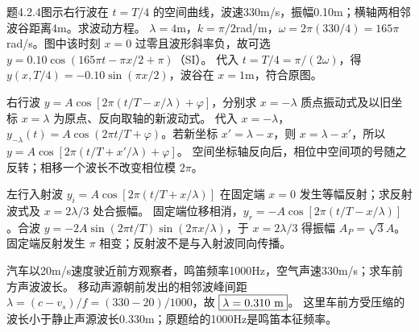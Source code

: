 \problemtext 题4.2.4图示右行波在 $t=T/4$ 的空间曲线，波速330m/s，振幅0.10m；横轴两相邻波谷距离4m。求波动方程。
\workings $\lambda=4$m，$k=\pi/2$rad/m，$\omega=2\pi(330/4)=165\pi$rad/s。图中该时刻 $x=0$ 过零且波形斜率负，故可选 $\boxed{y=0.10\cos(165\pi t-\pi x/2+\pi)}$（SI）。
\crosscheck 代入 $t=T/4=\pi/(2\omega)$，得 $y(x,T/4)=-0.10\sin(\pi x/2)$，波谷在 $x=1$m，符合原图。

\problemtext 右行波 $y=A\cos[2\pi(t/T-x/\lambda)+\varphi]$，分别求 $x=-\lambda$ 质点振动式及以旧坐标 $x=\lambda$ 为原点、反向取轴的新波动式。
\workings 代入 $x=-\lambda$，$\boxed{y_{-\lambda}(t)=A\cos(2\pi t/T+\varphi)}$。若新坐标 $x'=\lambda-x$，则 $x=\lambda-x'$，所以 $\boxed{y=A\cos[2\pi(t/T+x'/\lambda)+\varphi]}$。
\crosscheck 空间坐标轴反向后，相位中空间项的号随之反转；相移一个波长不改变相位模 $2\pi$。

\problemtext 左行入射波 $y_i=A\cos[2\pi(t/T+x/\lambda)]$ 在固定端 $x=0$ 发生等幅反射；求反射波式及 $x=2\lambda/3$ 处合振幅。
\workings 固定端位移相消，$\boxed{y_r=-A\cos[2\pi(t/T-x/\lambda)]}$。合波 $y=-2A\sin(2\pi t/T)\sin(2\pi x/\lambda)$，于 $x=2\lambda/3$ 得振幅 $\boxed{A_P=\sqrt3 A}$。
\crosscheck 固定端反射发生 $\pi$ 相变；反射波不是与入射波同向传播。

\problemtext 汽车以20m/s速度驶近前方观察者，鸣笛频率1000Hz，空气声速330m/s；求车前方声波波长。
\workings 移动声源朝前发出的相邻波峰间距 $\lambda=(c-v_s)/f=(330-20)/1000$，故 $\boxed{\lambda=0.310\ {\rm m}}$。
\crosscheck 这里车前方受压缩的波长小于静止声源波长0.330m；原题给的1000Hz是鸣笛本征频率。
